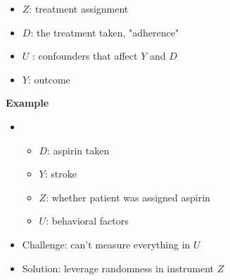 \begin{itemize}
    \item \( Z \): treatment assignment
    \item \( D \): the treatment taken, "adherence"
    \item\( U \) : confounders that affect \( Y \) and \( D \)
    \item \( Y \): outcome
\end{itemize}

\begin{center}
\end{center}

\textbf{Example}

\begin{itemize}
    \item
    \begin{itemize}
    \item \( D \): aspirin taken
    \item \( Y \): stroke
    \item \(  Z \): whether patient was assigned aspirin
    \item \( U \): behavioral factors
    \end{itemize}
    \item Challenge: can't measure everything in \( U \)
    \item Solution: leverage randomness in instrument \( Z \)
\end{itemize}

